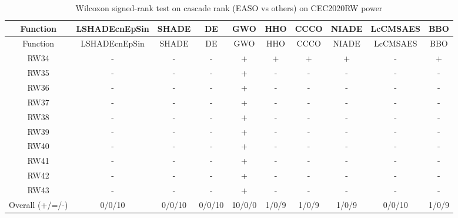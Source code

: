 \begin{center}
\small
\renewcommand{\arraystretch}{1.25}
\begin{longtable}{cccccccccc}
\caption{Wilcoxon signed-rank test on cascade rank (EASO vs others) on CEC2020RW  power}
\label{tab:wilcoxon_cascade_CEC2020RW_power} \\
\toprule
Function & LSHADEcnEpSin & SHADE & DE & GWO & HHO & CCCO & NIADE & LcCMSAES & BBO \\
\midrule
\endfirsthead
\toprule
Function & LSHADEcnEpSin & SHADE & DE & GWO & HHO & CCCO & NIADE & LcCMSAES & BBO \\
\midrule
\endhead
RW34 & - & - & - & + & + & + & + & - & + \\
RW35 & - & - & - & + & - & - & - & - & - \\
RW36 & - & - & - & + & - & - & - & - & - \\
RW37 & - & - & - & + & - & - & - & - & - \\
RW38 & - & - & - & + & - & - & - & - & - \\
RW39 & - & - & - & + & - & - & - & - & - \\
RW40 & - & - & - & + & - & - & - & - & - \\
RW41 & - & - & - & + & - & - & - & - & - \\
RW42 & - & - & - & + & - & - & - & - & - \\
RW43 & - & - & - & + & - & - & - & - & - \\
\midrule
Overall (+/=/-) & 0/0/10 & 0/0/10 & 0/0/10 & 10/0/0 & 1/0/9 & 1/0/9 & 1/0/9 & 0/0/10 & 1/0/9 \\
\bottomrule
\end{longtable}
\end{center}